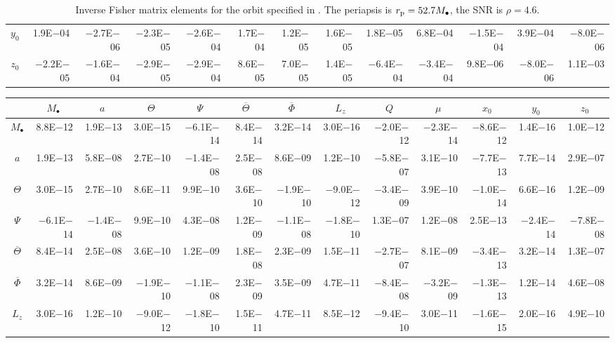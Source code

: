 \begin{sidewaystable}[htbp]
\begin{tabular}{crrrrrrrrrrrr}
$y_0$ & 1.9E$-$04 & $-$2.7E$-$06 & $-$2.3E$-$05 & $-$2.6E$-$04 & 1.7E$-$04 & 1.2E$-$05 & 1.6E$-$05 & 1.8E$-$05 & 6.8E$-$04 & $-$1.5E$-$04 & 3.9E$-$04 & $-$8.0E$-$06 \\
$z_0$ & $-$2.2E$-$05 & $-$1.6E$-$04 & $-$2.9E$-$05 & $-$2.9E$-$04 & 8.6E$-$05 & 7.0E$-$05 & 1.4E$-$05 & $-$6.4E$-$04 & $-$3.4E$-$04 & 9.8E$-$06 & $-$8.0E$-$06 & 1.1E$-$03 \\
\bottomrule
\end{tabular}
\caption{Inverse Fisher matrix elements for the orbit specified in . The periapsis is $r_\mathrm{p} = 52.7 M_\bullet$, the SNR is $\rho = 4.6$.}
\label{tab:Fisher_3}
\end{sidewaystable}
\begin{sidewaystable}[htbp]\scriptsize
\centering
\begin{tabular}{crrrrrrrrrrrr}
\toprule
 & \multicolumn{1}{c}{$M_\bullet$} & \multicolumn{1}{c}{$a$} & \multicolumn{1}{c}{$\Theta$} & \multicolumn{1}{c}{$\Psi$} & \multicolumn{1}{c}{$\overline{\Theta}$} & \multicolumn{1}{c}{$\overline{\Phi}$} & \multicolumn{1}{c}{$L_z$} & \multicolumn{1}{c}{$Q$} & \multicolumn{1}{c}{$\mu$} & \multicolumn{1}{c}{$x_0$} & \multicolumn{1}{c}{$y_0$} & \multicolumn{1}{c}{$z_0$} \\ \midrule 
$M_\bullet$ & 8.8E$-$12 & 1.9E$-$13 & 3.0E$-$15 & $-$6.1E$-$14 & 8.4E$-$14 & 3.2E$-$14 & 3.0E$-$16 & $-$2.0E$-$12 & $-$2.3E$-$14 & $-$8.6E$-$12 & 1.4E$-$16 & 1.0E$-$12 \\
$a$ & 1.9E$-$13 & 5.8E$-$08 & 2.7E$-$10 & $-$1.4E$-$08 & 2.5E$-$08 & 8.6E$-$09 & 1.2E$-$10 & $-$5.8E$-$07 & 3.1E$-$10 & $-$7.7E$-$13 & 7.7E$-$14 & 2.9E$-$07 \\
$\Theta$ & 3.0E$-$15 & 2.7E$-$10 & 8.6E$-$11 & 9.9E$-$10 & 3.6E$-$10 & $-$1.9E$-$10 & $-$9.0E$-$12 & $-$3.4E$-$09 & 3.9E$-$10 & $-$1.0E$-$14 & 6.6E$-$16 & 1.2E$-$09 \\
$\Psi$ & $-$6.1E$-$14 & $-$1.4E$-$08 & 9.9E$-$10 & 4.3E$-$08 & 1.2E$-$09 & $-$1.1E$-$08 & $-$1.8E$-$10 & 1.3E$-$07 & 1.2E$-$08 & 2.5E$-$13 & $-$2.4E$-$14 & $-$7.8E$-$08 \\
$\overline{\Theta}$ & 8.4E$-$14 & 2.5E$-$08 & 3.6E$-$10 & 1.2E$-$09 & 1.8E$-$08 & 2.3E$-$09 & 1.5E$-$11 & $-$2.7E$-$07 & 8.1E$-$09 & $-$3.4E$-$13 & 3.2E$-$14 & 1.3E$-$07 \\
$\overline{\Phi}$ & 3.2E$-$14 & 8.6E$-$09 & $-$1.9E$-$10 & $-$1.1E$-$08 & 2.3E$-$09 & 3.5E$-$09 & 4.7E$-$11 & $-$8.4E$-$08 & $-$3.2E$-$09 & $-$1.3E$-$13 & 1.2E$-$14 & 4.6E$-$08 \\
$L_z$ & 3.0E$-$16 & 1.2E$-$10 & $-$9.0E$-$12 & $-$1.8E$-$10 & 1.5E$-$11 & 4.7E$-$11 & 8.5E$-$12 & $-$9.4E$-$10 & 3.0E$-$11 & $-$1.6E$-$15 & 2.0E$-$16 & 4.9E$-$10 \\

\end{tabular}
\end{sidewaystable}
